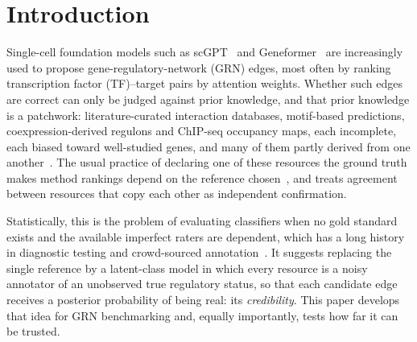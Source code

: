 \section{Introduction}\label{sec:intro}

Single-cell foundation models such as scGPT~\citep{cui2024scgpt} and Geneformer~\citep{theodoris2023transfer} are increasingly used to propose gene-regulatory-network (GRN) edges, most often by ranking transcription factor (TF)--target pairs by attention weights.
Whether such edges are correct can only be judged against prior knowledge, and that prior knowledge is a patchwork: literature-curated interaction databases, motif-based predictions, coexpression-derived regulons and ChIP-seq occupancy maps, each incomplete, each biased toward well-studied genes, and many of them partly derived from one another~\citep{garcia2019benchmark,mullerdott2023collectri}.
The usual practice of declaring one of these resources the ground truth makes method rankings depend on the reference chosen~\citep{pratapa2020benchmarking}, and treats agreement between resources that copy each other as independent confirmation.

Statistically, this is the problem of evaluating classifiers when no gold standard exists and the available imperfect raters are dependent, which has a long history in diagnostic testing and crowd-sourced annotation~\citep{dawid1979maximum,hui1980estimating,dendukuri2001bayesian,albert2004cautionary}.
It suggests replacing the single reference by a latent-class model in which every resource is a noisy annotator of an unobserved true regulatory status, so that each candidate edge receives a posterior probability of being real: its \emph{credibility}.
This paper develops that idea for GRN benchmarking and, equally importantly, tests how far it can be trusted.

